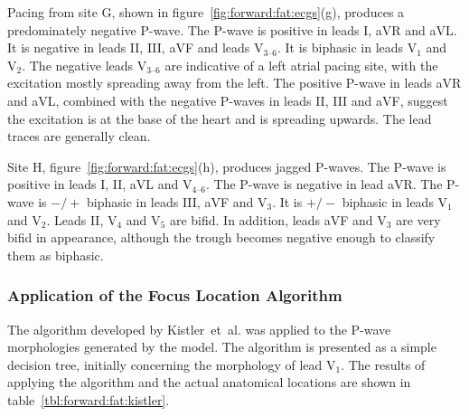 Pacing from site G, shown in figure~\ref{fig:forward:fat:ecgs}(g), produces a
predominately negative P-wave.
The P-wave is positive in leads I, aVR and aVL.
It is negative in leads II, III, aVF and leads $\text{V}_{\text{3--6}}$.
It is biphasic in leads $\text{V}_{\text{1}}$ and $\text{V}_{\text{2}}$.
The negative leads $\text{V}_{\text{3--6}}$ are indicative of a left atrial
pacing site, with the excitation mostly spreading away from the left.
The positive P-wave in leads aVR and aVL, combined with the negative P-waves in
leads II, III and aVF, suggest the excitation is at the base of the heart and is
spreading upwards.
The lead traces are generally clean.

Site H, figure~\ref{fig:forward:fat:ecgs}(h), produces jagged P-waves.
The P-wave is positive in leads I, II, aVL and $\text{V}_{\text{4--6}}$.
The P-wave is negative in lead aVR.
The P-wave is $-/+$ biphasic in leads III, aVF and $\text{V}_{\text{3}}$.
It is $+/-$ biphasic in leads $\text{V}_{\text{1}}$ and $\text{V}_{\text{2}}$.
Leads II, $\text{V}_{\text{4}}$ and $\text{V}_{\text{5}}$ are bifid.
In addition, leads aVF and $\text{V}_{\text{3}}$ are very bifid in appearance,
although the trough becomes negative enough to classify them as biphasic.

\subsubsection{Application of the Focus Location Algorithm}

The algorithm developed by Kistler~et~al. was applied to the P-wave morphologies
generated by the model.
The algorithm is presented as a simple decision tree, initially concerning the
morphology of lead $\text{V}_{\text{1}}$.
The results of applying the algorithm and the actual anatomical locations are
shown in table~\ref{tbl:forward:fat:kistler}.


